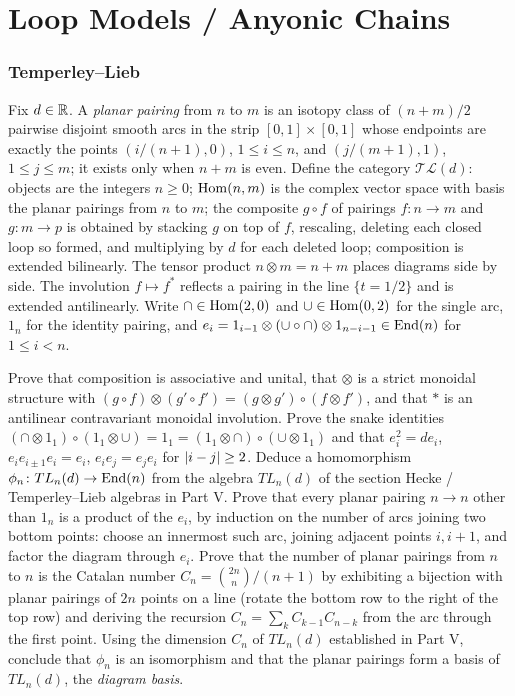 \part{Loop Models / Anyonic Chains}

\section{Temperley--Lieb}

\begin{exercise}
Fix $d\in\mathbb R$. A \emph{planar pairing} from $n$ to $m$ is an isotopy class of $(n+m)/2$ pairwise disjoint smooth arcs in the strip $[0,1]\times[0,1]$ whose endpoints are exactly the points $(i/(n+1),0)$, $1\le i\le n$, and $(j/(m+1),1)$, $1\le j\le m$; it exists only when $n+m$ is even. Define the category $\mathcal{TL}(d)$: objects are the integers $n\ge0$; $\operatorname{Hom}(n,m)$ is the complex vector space with basis the planar pairings from $n$ to $m$; the composite $g\circ f$ of pairings $f\colon n\to m$ and $g\colon m\to p$ is obtained by stacking $g$ on top of $f$, rescaling, deleting each closed loop so formed, and multiplying by $d$ for each deleted loop; composition is extended bilinearly. The tensor product $n\otimes m=n+m$ places diagrams side by side. The involution $f\mapsto f^*$ reflects a pairing in the line $\{t=1/2\}$ and is extended antilinearly. Write $\cap\in\operatorname{Hom}(2,0)$ and $\cup\in\operatorname{Hom}(0,2)$ for the single arc, $1_n$ for the identity pairing, and $e_i=1_{i-1}\otimes(\cup\circ\cap)\otimes1_{n-i-1}\in\operatorname{End}(n)$ for $1\le i<n$.

Prove that composition is associative and unital, that $\otimes$ is a strict monoidal structure with $(g\circ f)\otimes(g'\circ f')=(g\otimes g')\circ(f\otimes f')$, and that $*$ is an antilinear contravariant monoidal involution. Prove the snake identities $(\cap\otimes1_1)\circ(1_1\otimes\cup)=1_1=(1_1\otimes\cap)\circ(\cup\otimes1_1)$ and that $e_i^2=de_i$, $e_ie_{i\pm1}e_i=e_i$, $e_ie_j=e_je_i$ for $\left\lvert i-j\right\rvert\ge2$. Deduce a homomorphism $\phi_n\colon TL_n(d)\to\operatorname{End}(n)$ from the algebra $TL_n(d)$ of the section Hecke / Temperley--Lieb algebras in Part V. Prove that every planar pairing $n\to n$ other than $1_n$ is a product of the $e_i$, by induction on the number of arcs joining two bottom points: choose an innermost such arc, joining adjacent points $i,i+1$, and factor the diagram through $e_i$. Prove that the number of planar pairings from $n$ to $n$ is the Catalan number $C_n=\binom{2n}{n}/(n+1)$ by exhibiting a bijection with planar pairings of $2n$ points on a line (rotate the bottom row to the right of the top row) and deriving the recursion $C_{n}=\sum_{k}C_{k-1}C_{n-k}$ from the arc through the first point. Using the dimension $C_n$ of $TL_n(d)$ established in Part V, conclude that $\phi_n$ is an isomorphism and that the planar pairings form a basis of $TL_n(d)$, the \emph{diagram basis}.
\end{exercise}

